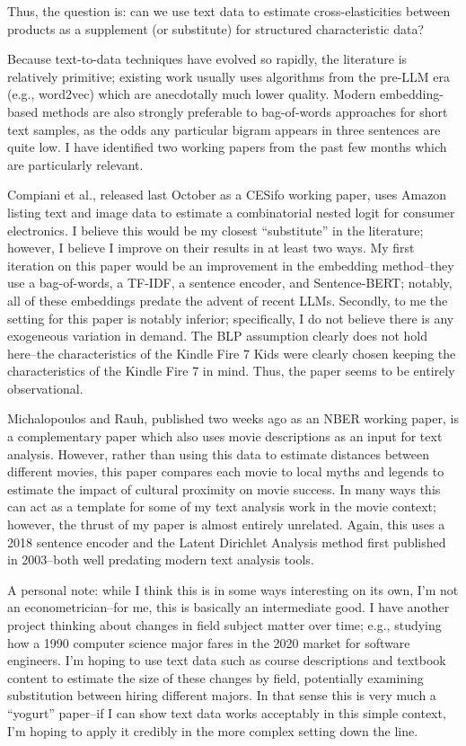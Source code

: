 \documentclass{article}
\begin{document}
Thus, the question is: can we use text data to estimate cross-elasticities between products as a supplement (or substitute) for structured characteristic data?

Because text-to-data techniques have evolved so rapidly, the literature is relatively primitive; existing work usually uses algorithms from the pre-LLM era (e.g., word2vec) which are anecdotally much lower quality. Modern embedding-based methods are also strongly preferable to bag-of-words approaches for short text samples, as the odds any particular bigram appears in three sentences are quite low. I have identified two working papers from the past few months which are particularly relevant. 

Compiani et al., released last October as a CESifo working paper, uses Amazon listing text and image data to estimate a combinatorial nested logit for consumer electronics. I believe this would be my closest ``substitute'' in the literature; however, I believe I improve on their results in at least two ways. My first iteration on this paper would be an improvement in the embedding method--they use a bag-of-words, a TF-IDF, a sentence encoder, and Sentence-BERT; notably, all of these embeddings predate the advent of recent LLMs. Secondly, to me the setting for this paper is notably inferior; specifically, I do not believe there is any exogeneous variation in demand. The BLP assumption clearly does not hold here--the characteristics of the Kindle Fire 7 Kids were clearly chosen keeping the characteristics of the Kindle Fire 7 in mind. Thus, the paper seems to be entirely observational. 

Michalopoulos and Rauh, published two weeks ago as an NBER working paper, is a complementary paper which also uses movie descriptions as an input for text analysis. However, rather than using this data to estimate distances between different movies, this paper compares each movie to local myths and legends to estimate the impact of cultural proximity on movie success. In many ways this can act as a template for some of my text analysis work in the movie context; however, the thrust of my paper is almost entirely unrelated. Again, this uses a 2018 sentence encoder and the Latent Dirichlet Analysis method first published in 2003--both well predating modern text analysis tools. 

A personal note: while I think this is in some ways interesting on its own, I'm not an econometrician--for me, this is basically an intermediate good. I have another project thinking about changes in field subject matter over time; e.g., studying how a 1990 computer science major fares in the 2020 market for software engineers. I'm hoping to use text data such as course descriptions and textbook content to estimate the size of these changes by field, potentially examining substitution between hiring different majors. In that sense this is very much a ``yogurt'' paper--if I can show text data works acceptably in this simple context, I'm hoping to apply it credibly in the more complex setting down the line.
\end{document}
